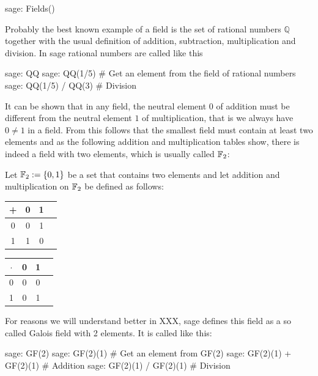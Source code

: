 \begin{sagecommandline}
sage: Fields()
\end{sagecommandline}

\begin{example} Probably the best known example of a field is the set of rational numbers $\mathbb{Q}$ together with the usual definition of addition, subtraction, multiplication and division. In sage rational numbers are called like this
\begin{sagecommandline}
sage: QQ
sage: QQ(1/5) # Get an element from the field of rational numbers
sage: QQ(1/5) / QQ(3) # Division
\end{sagecommandline}
\end{example}
\begin{example} It can be shown that in any field, the neutral element $0$ of addition must be different from the neutral element $1$ of multiplication, that is we always have $0\neq 1$ in a field. From this follows that the smallest field must contain at least two elements and as the following addition and multiplication tables show, there is indeed a field with two elements, which is usually called $\mathbb{F}_2$:

Let $\mathbb{F}_2:=\{0,1 \}$ be a set that contains two elements and let addition and multiplication on $\mathbb{F}_2$ be defined as follows:
\begin{center}
  \begin{tabular}{c | c c c}
    + & 0 & 1 \\\hline
    0 & 0 & 1\\
    1 & 1 & 0 \\
  \end{tabular} \quad \quad \quad \quad
  \begin{tabular}{c | c c c}
$\cdot$ & 0 & 1 \\\hline
      0 & 0 & 0 \\
      1 & 0 & 1 \\
  \end{tabular}
\end{center}
For reasons we will understand better in XXX, sage defines this field as a so called Galois field with 2 elements. It is called like this:
\begin{sagecommandline}
sage: GF(2)
sage: GF(2)(1) # Get an element from GF(2)
sage: GF(2)(1) + GF(2)(1) # Addition
sage: GF(2)(1) / GF(2)(1) # Division
\end{sagecommandline}
\end{example}

